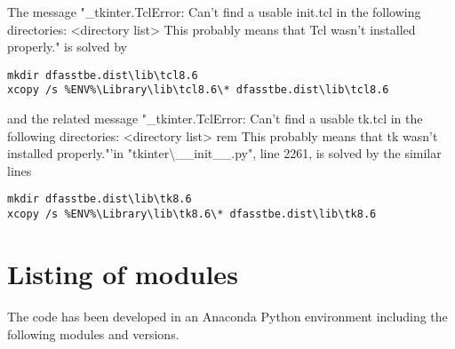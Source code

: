 The message "\_tkinter.TclError: Can't find a usable init.tcl in the following directories: <directory list> This probably means that Tcl wasn't installed properly." is solved by

\begin{Verbatim}
mkdir dfasstbe.dist\lib\tcl8.6
xcopy /s %ENV%\Library\lib\tcl8.6\* dfasstbe.dist\lib\tcl8.6
\end{Verbatim}

and the related message "\_tkinter.TclError: Can't find a usable tk.tcl in the following directories: <directory list> rem This probably means that tk wasn't installed properly."'in "tkinter\textbackslash{}\_\_init\_\_.py", line 2261, is solved by the similar lines

\begin{Verbatim}
mkdir dfasstbe.dist\lib\tk8.6
xcopy /s %ENV%\Library\lib\tk8.6\* dfasstbe.dist\lib\tk8.6
\end{Verbatim}

\section{Listing of modules}

The code has been developed in an Anaconda Python environment including the following modules and versions.

